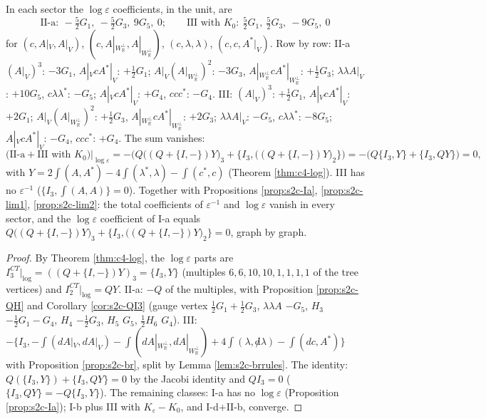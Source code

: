 \begin{theorem}
\label{thm:s2c-log}
In each sector the $\log\varepsilon$ coefficients, in the unit, are
\[
\text{II-a}:\ -\tfrac52G_1,\ -\tfrac52G_3,\ 9G_5,\ 0;\qquad \text{III with }K_0:\ \tfrac52G_1,\ \tfrac52G_3,\ -9G_5,\ 0
\]
for $(c,A|_V,A|_V)$, $(c,A|_{W_{\mathbb R}^\perp},A|_{W_{\mathbb R}^\perp})$, $(c,\lambda,\lambda)$, $(c,c,A^*|_V)$. Row by row: II-a $(A|_V)^3$: $-3G_1$, $A|_VcA^*|_V$: $+\tfrac12G_1$; $A|_V(A|_{W_{\mathbb R}^\perp})^2$: $-3G_3$, $A|_{W_{\mathbb R}^\perp}cA^*|_{W_{\mathbb R}^\perp}$: $+\tfrac12G_3$; $\lambda\lambda A|_V$: $+10G_5$, $c\lambda\lambda^*$: $-G_5$; $A|_VcA^*|_V$: $+G_4$, $ccc^*$: $-G_4$. III: $(A|_V)^3$: $+\tfrac12G_1$, $A|_VcA^*|_V$: $+2G_1$; $A|_V(A|_{W_{\mathbb R}^\perp})^2$: $+\tfrac12G_3$, $A|_{W_{\mathbb R}^\perp}cA^*|_{W_{\mathbb R}^\perp}$: $+2G_3$; $\lambda\lambda A|_V$: $-G_5$, $c\lambda\lambda^*$: $-8G_5$; $A|_VcA^*|_V$: $-G_4$, $ccc^*$: $+G_4$. The sum vanishes:
\[
\big(\text{II-a}+\text{III with }K_0\big)\big|_{\log\varepsilon}=-\Big(Q\big((Q+\{I,-\})Y\big)_3+\big\{I_3,\big((Q+\{I,-\})Y\big)_2\big\}\Big)=-\Big(Q\{I_3,Y\}+\{I_3,QY\}\Big)=0,
\]
with $Y=2\int(A,A^*)-4\int(\lambda^*,\lambda)-\int(c^*,c)$ (Theorem \ref{thm:c4-log}). III has no $\varepsilon^{-1}$ ($\{I_3,\int(A,A)\}=0$). Together with Propositions \ref{prop:s2c-Ia}, \ref{prop:s2c-lim1}, \ref{prop:s2c-lim2}: the total coefficients of $\varepsilon^{-1}$ and $\log\varepsilon$ vanish in every sector, and the $\log\varepsilon$ coefficient of I-a equals $Q\big((Q+\{I,-\})Y\big)_3+\big\{I_3,\big((Q+\{I,-\})Y\big)_2\big\}=0$, graph by graph.
\end{theorem}

\begin{proof}
By Theorem \ref{thm:c4-log}, the $\log\varepsilon$ parts are $I^{CT}_3|_{\log}=((Q+\{I,-\})Y)_3=\{I_3,Y\}$ (multiples $6,6,10,10,1,1,1,1$ of the tree vertices) and $I^{CT}_2|_{\log}=QY$. II-a: $-Q$ of the multiples, with Proposition \ref{prop:s2c-QH} and Corollary \ref{cor:s2c-QI3} (gauge vertex $\tfrac12G_1+\tfrac12G_3$, $\lambda\lambda A$ $-G_5$, $H_3$ $-\tfrac12G_1-G_4$, $H_4$ $-\tfrac12G_3$, $H_5$ $G_5$, $\tfrac12H_6$ $G_4$). III: $-\{I_3,-\int(dA|_V,dA|_V)-\int(dA|_{W_{\mathbb R}^\perp},dA|_{W_{\mathbb R}^\perp})+4\int(\lambda,{\not d}\lambda)-\int(dc,A^*)\}$ with Proposition \ref{prop:s2c-br}, split by Lemma \ref{lem:s2c-brrules}. The identity: $Q(\{I_3,Y\})+\{I_3,QY\}=0$ by the Jacobi identity and $QI_3=0$ ($\{I_3,QY\}=-Q\{I_3,Y\}$). The remaining classes: I-a has no $\log\varepsilon$ (Proposition \ref{prop:s2c-Ia}); I-b plus III with $K_\varepsilon-K_0$, and I-d$+$II-b, converge.
\end{proof}

